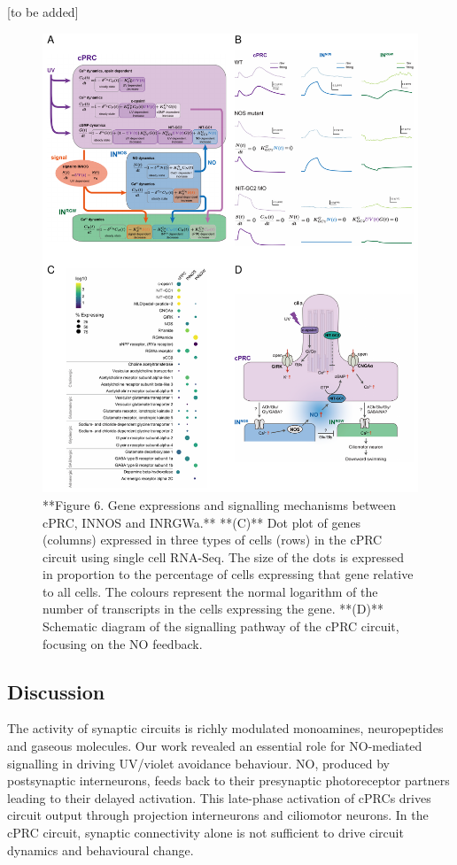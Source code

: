 \documentclass[
  10pt,
  onecolumn]{article}
\begin{document}
{[}to be added{]}

\begin{figure}
\includegraphics[width=25in]{figures/Fig6} \caption{**Figure 6. Gene expressions and signalling mechanisms between cPRC, INNOS and INRGWa.** **(C)** Dot plot of genes (columns) expressed in three types of cells (rows) in the cPRC circuit using single cell RNA-Seq. The size of the dots is expressed in proportion to the percentage of cells expressing that gene relative to all cells. The colours represent the normal logarithm of the number of transcripts in the cells expressing the gene. **(D)** Schematic diagram of the signalling pathway of the cPRC circuit, focusing on the NO feedback.}\label{fig:unnamed-chunk-6}
\end{figure}

\hypertarget{discussion}{%
\subsection{Discussion}\label{discussion}}

The activity of synaptic circuits is richly modulated monoamines,
neuropeptides and gaseous molecules. Our work revealed an essential role
for NO-mediated signalling in driving UV/violet avoidance behaviour. NO,
produced by postsynaptic interneurons, feeds back to their presynaptic
photoreceptor partners leading to their delayed activation. This
late-phase activation of cPRCs drives circuit output through projection
interneurons and ciliomotor neurons. In the cPRC circuit, synaptic
connectivity alone is not sufficient to drive circuit dynamics and
behavioural change.
\end{document}
